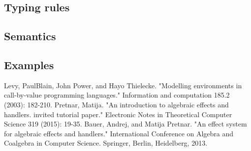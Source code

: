 \documentclass[12pt]{article}
\begin{document}
\subsection{Typing rules}
\subsection{Semantics}
\subsection{Examples}

\begin{thebibliography}{9}
Levy, PaulBlain, John Power, and Hayo Thielecke. "Modelling environments in call-by-value programming languages." Information and computation 185.2 (2003): 182-210.
Pretnar, Matija. "An introduction to algebraic effects and handlers. invited tutorial paper." Electronic Notes in Theoretical Computer Science 319 (2015): 19-35.
Bauer, Andrej, and Matija Pretnar. "An effect system for algebraic effects and handlers." International Conference on Algebra and Coalgebra in Computer Science. Springer, Berlin, Heidelberg, 2013.
\end{thebibliography}
\end{document}
